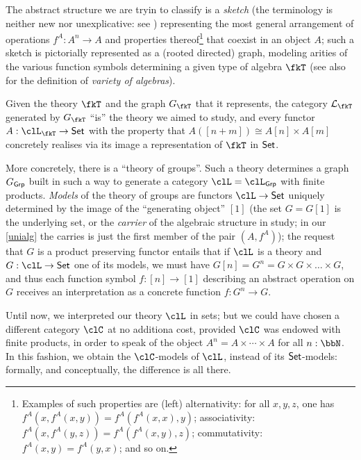The abstract structure we are tryin to classify is a \emph{sketch} (the terminology is neither new nor unexplicative: see \cite{ehresmann1968esquisses,coppey1984leccons, Bor2}) representing the most general arrangement of operations $f^A : A^n \to A$ and properties thereof\footnote{Examples of such properties are (left) alternativity: for all $x,y,z$, one has $f^A(x,f^A(x,y)) = f^A(f^A(x,x),y)$; associativity: $f^A(x,f^A(y,z)) = f^A(f^A(x,y),z)$; commutativity: $f^A(x,y)=f^A(y,x)$; and so on.} that coexist in an object $A$; such a sketch is pictorially represented as a (rooted directed) graph, modeling arities of the various function symbols determining a given type of algebra $\fkT$ (see also \cite{grillet} for the definition of \emph{variety of algebras}).%

Given the theory $\fkT$ and the graph $G_{\fkT}$ that it represents, the category $\mathcal{L}_{\fkT}$ generated by $G_\fkT$ ``is'' the theory we aimed to study, and every functor $A: \clL_{\fkT} \to \Set$ with the property that $A([n+m]) \cong A[n] \times A[m]$ concretely realises via its image a representation of $\fkT$ in $\mathsf{Set}$.

More concretely, there is a ``theory of groups''. Such a theory determines a graph $G_{\mathsf{Grp}}$ built in such a way to generate a category $\clL=\clL_{\cate{Grp}}$ with finite products. \emph{Models} of the theory of groups are functors $\clL \to \Set$ uniquely determined by the image of the ``generating object'' $[1]$ (the set $G=G[1]$ is the underlying set, or the \emph{carrier} of the algebraic structure in study; in our \autoref{unialg} the carries is just the first member of the pair $(A,f^A)$); the request that $G$ is a product preserving functor entails that if $\clL$ is a theory and $G : \clL \to \Set$ one of its models, we must have $G[n]=G^n = G \times G \times\dots\times G$, and thus each function symbol $f : [n]\to [1]$ describing an abstract operation on $G$ receives an interpretation as a concrete function $f : G^n \to G$.

Until now, we interpreted our theory $\clL$ in sets; but we could have chosen a different category $\clC$ at no additiona cost, provided $\clC$ was endowed with finite products, in order to speak of the object $A^n = A\times \cdots\times A$ for all $n : \bbN$. In this fashion, we obtain the $\clC$-models of $\clL$, instead of its $\mathsf{Set}$-models: formally, and conceptually, the difference is all there.

